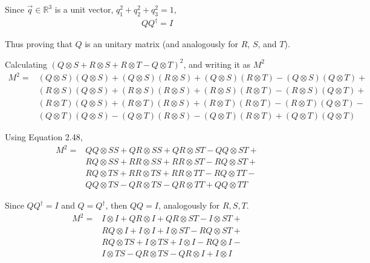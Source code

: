 Since $\vec{q} \in \mathbb{R}^3$ is a unit vector,
$q_1^2 + q_2^2 + q_3^2 = 1$,
%
\begin{align}
    \label{eq:nielsen-and-chuang-problem-2-3-q-qdagger-equals-i}
    Q Q^\dagger = I
\end{align}

Thus proving that $Q$ is an unitary matrix
(and analogously for $R$, $S$, and $T$).

Calculating $(Q \otimes S + R \otimes S + R \otimes T - Q \otimes T)^2$,
and writing it as $M^2$
%
\begin{align}
    M^2 =
    &(Q \otimes S)(Q \otimes S) + (Q \otimes S)(R \otimes S) +
    (Q \otimes S)(R \otimes T) - (Q \otimes S)(Q \otimes T) +
    \nonumber \\
    & (R \otimes S)(Q \otimes S) + (R \otimes S)(R \otimes S) +
    (R \otimes S)(R \otimes T) - (R \otimes S)(Q \otimes T) +
    \nonumber \\
    &(R \otimes T)(Q \otimes S) + (R \otimes T)(R \otimes S) +
    (R \otimes T)(R \otimes T) - (R \otimes T)(Q \otimes T) -
    \nonumber \\
    &(Q \otimes T)(Q \otimes S) - (Q \otimes T)(R \otimes S) -
    (Q \otimes T)(R \otimes T) + (Q \otimes T)(Q \otimes T)
\end{align}

Using Equation 2.48,
%
\begin{align}
    M^2 =
    &QQ \otimes SS + QR \otimes SS + QR \otimes ST - QQ \otimes ST +
    \nonumber \\
    &RQ \otimes SS + RR \otimes SS + RR \otimes ST - RQ \otimes ST +
    \nonumber \\
    &RQ \otimes TS + RR \otimes TS + RR \otimes TT - RQ \otimes TT -
    \nonumber \\
    &QQ \otimes TS - QR \otimes TS - QR \otimes TT + QQ \otimes TT
\end{align}

Since $QQ^\dagger = I$ and $Q = Q^\dagger$, then $QQ = I$,
analogously for $R, S, T$.
%
\begin{align}
    M^2 = 
    &I \otimes I + QR \otimes I + QR \otimes ST - I \otimes ST +
    \nonumber \\
    &RQ \otimes I + I \otimes I + I \otimes ST - RQ \otimes ST +
    \nonumber \\
    &RQ \otimes TS + I \otimes TS + I \otimes I - RQ \otimes I -
    \nonumber \\
    &I \otimes TS - QR \otimes TS - QR \otimes I + I \otimes I
\end{align}

